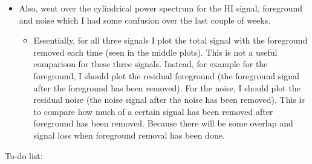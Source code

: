 \begin{itemize}
\begin{itemize}
    \item I said how there was an error with optimize.fmin so I used optimize.minimize instead. I used bounds and found that the foreground signal component kept on growing whenever I made the bounds larger and this is as expected I think?
    \item Zhaoting mentioned there was something not quite right in the power spectra produced. There is still a lot of residual foreground which needs to be removed. This can be seen in both the 1D and cylindrical power spectra. 
    \item This is either a value issue or optimisation issue. Try to find different methods which will make this work better. Either a different optimisation function or ...
    \item The difference between optimize.fmin and optimize.miminize is that optimize.fmin find the local minimum whereas optimize.minimize finds the global minimum. Maybe try to find an optimisation routine that does something different and see how that works?
\end{itemize}
\item Also, went over the cylindrical power spectrum for the HI signal, foreground and noise which I had some confusion over the last couple of weeks.
\begin{itemize}
    \item Essentially, for all three signals I plot the total signal with the foreground removed each time (seen in the middle plots). This is not a useful comparison for these three signals. Instead, for example for the foreground, I should plot the residual foreground (the foreground signal after the foreground has been removed). For the noise, I should plot the residual noise (the noise signal after the noise has been removed). This is to compare how much of a certain signal has been removed after foreground has been removed. Because there will be some overlap and signal loss when foreground removal has been done.
\end{itemize}
\end{itemize}

To-do list:

